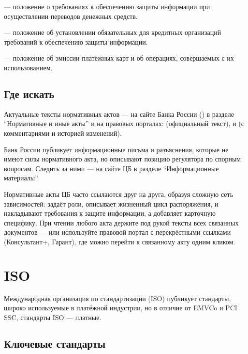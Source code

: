 \textbf{} — положение о требованиях к обеспечению
защиты информации при осуществлении переводов денежных
средств.

\textbf{} — положение об установлении обязательных
для кредитных организаций требований к обеспечению защиты
информации.

\textbf{} — положение об эмиссии платёжных карт
и об операциях, совершаемых с их использованием.

\subsection*{Где искать}

Актуальные тексты нормативных актов — на сайте Банка России
() в разделе \enquote{Нормативные и иные акты}
и на правовых порталах:  (официальный
текст),  и 
(с комментариями и историей изменений).

Банк России публикует информационные письма и разъяснения,
которые не имеют силы нормативного акта, но описывают
позицию регулятора по спорным вопросам. Следить за ними —
на сайте ЦБ в разделе \enquote{Информационные материалы}.

\begin{kaobox}[title=На практике]
  Нормативные акты ЦБ часто ссылаются друг на друга,
  образуя сложную сеть зависимостей:  задаёт
  роли,  описывает жизненный цикл распоряжения,
   и  накладывают требования к защите
  информации, а  добавляет карточную специфику.
  При чтении любого акта держите под рукой тексты всех
  связанных документов — или используйте правовой портал
  с перекрёстными ссылками (Консультант+, Гарант), где можно
  перейти к связанному акту одним кликом.
\end{kaobox}

\section{ISO}
\label{sec:ps-iso}

Международная организация по стандартизации (ISO) публикует
стандарты, широко используемые в платёжной индустрии,
но в отличие от EMVCo и PCI SSC, стандарты ISO —
платные.

\subsection*{Ключевые стандарты}

